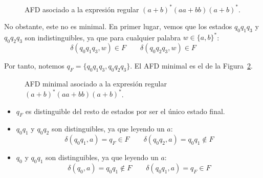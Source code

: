 \begin{ejercicio}
\begin{figure}
\begin{tikzpicture}
        \end{tikzpicture}
        \caption{AFD asociado a la expresión regular ${(a+b)}^{\ast}(aa+bb){(a+b)}^{\ast}$.}
        \label{fig:1.3.10-AFD}
    \end{figure}

    No obstante, este no es minimal. En primer lugar, vemos que los estados $q_0q_1q_3$ y $q_0q_2q_3$ son indistinguibles, ya que para cualquier palabra $w\in \{a,b\}^*$:
    \begin{equation*}
        \delta(q_0q_1q_3,w)\in F\qquad \delta(q_0q_2q_3,w)\in F
    \end{equation*}

    Por tanto, notemos $q_F=\{q_0q_1q_3,q_0q_2q_3\}$. El AFD minimal es el de la Figura~\ref{fig:1.3.10-AFD-Minimal}.
    \begin{figure}
        \centering
        \caption{AFD minimal asociado a la expresión regular ${(a+b)}^{\ast}(aa+bb){(a+b)}^{\ast}$.}
        \label{fig:1.3.10-AFD-Minimal}
    \end{figure}
    \begin{itemize}
        \item $q_F$ es distinguible del resto de estados por ser el único estado final.
        \item $q_0q_1$ y $q_0q_2$ son distinguibles, ya que leyendo un $a$:
        \begin{equation*}
            \delta(q_0q_1,a)=q_F\in F\qquad \delta(q_0q_2,a)=q_0q_1\notin F
        \end{equation*}

        \item $q_0$ y $q_0q_1$ son distinguibles, ya que leyendo un $a$:
        \begin{equation*}
            \delta(q_0,a)=q_0q_1\notin F\qquad \delta(q_0q_1,a)=q_F\in F
        \end{equation*}


\end{itemize}
\end{ejercicio}

